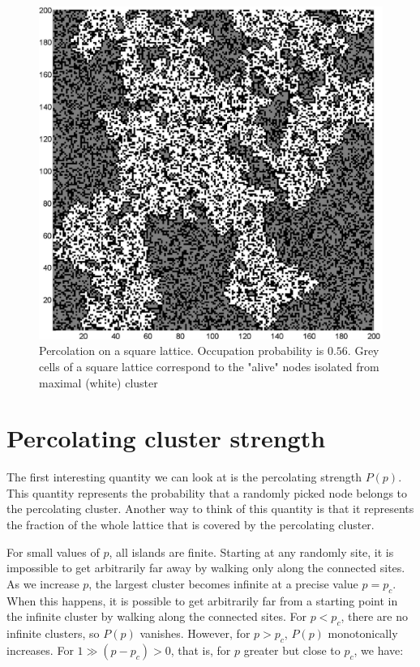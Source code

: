 \begin{figure}[H]
  \includegraphics[width=\linewidth]{Images/2dlattice_perc.png}
  \caption{Percolation on a square lattice. Occupation probability is $0.56$. Grey cells of a square lattice correspond to the "alive" nodes isolated from maximal (white) cluster
}
  \label{fig:2dlattice_perc}
\end{figure}


\section{Percolating cluster strength}
\label{sec:th_percolating_cluster_strength}

The first interesting quantity we can look at is the percolating strength $P(p)$. This quantity  represents the probability that a randomly picked node belongs to the percolating cluster. Another way to think of this quantity is that it represents the fraction of the whole lattice that is covered by the percolating cluster. 

For small values of $p$, all islands are finite. Starting at any randomly site, it is impossible to get arbitrarily far away by walking only along the connected sites. As we increase $p$, the largest cluster becomes infinite at a precise value $p = p_c$. When this happens, it is possible to get arbitrarily far from a starting point in the infinite cluster by walking along the connected sites. For $p < p_c$, there are no infinite clusters, so $P(p)$ vanishes. However, for $p > p_c$, $P(p)$ monotonically increases. For $1 \gg (p - p_c) > 0$, that is, for $p$ greater  but close to $p_c$, we have\cite{intro_to_percolation_theory}:

